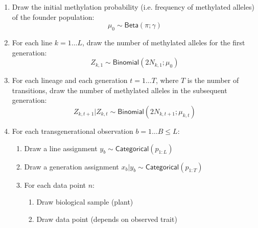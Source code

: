 \documentclass[preview]{standalone}
\begin{document}
\begin{enumerate}
\item Draw the initial methylation probability (i.e. frequency of
  methylated alleles) of the founder population:
  \begin{displaymath}
    \mu_0 \sim \mathsf{Beta}(\pi; \gamma)
  \end{displaymath}
\item For each line \( k=1 \ldots L \), draw the number of methylated
  alleles for the first generation:
  \begin{displaymath}
     Z_{k,1} \sim \mathsf{Binomial}(2N_{k,1}; \mu_{0})
  \end{displaymath}
\item For each lineage and each generation \(t=1 \ldots T\), where
  \(T\) is the number of transitions, draw the number of methylated
  alleles in the subsequent generation:
  \begin{displaymath}
    Z_{k,t+1} | Z_{k,t} \sim \mathsf{Binomial}(2N_{k,t+1}; \mu_{k,t})
  \end{displaymath}
\item For each transgenerational observation \( b = 1 \ldots B \leq L \):
  \begin{enumerate}
  \item Draw a line assignment \( y_{b} \sim \mathsf{Categorical}(p_{1:L}) \)
  \item Draw a generation assignment \( x_b | y_{b} \sim \mathsf{Categorical}(p_{1:T}) \)
  \item For each data point $n$:
    \begin{enumerate}
    \item Draw biological sample (plant)
    \item Draw data point (depends on observed trait)
    \end{enumerate}
  \end{enumerate}
\end{enumerate}
\end{document}

